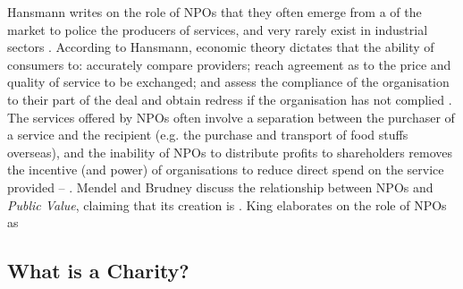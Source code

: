 %
Hansmann writes on the role of NPOs that they often emerge from a  of the market to police the producers of services, and very rarely exist in industrial sectors \cite{hansmann_role_1980}. According to Hansmann, economic theory dictates that the ability of consumers to: accurately compare providers; reach agreement as to the price and quality of service to be exchanged; and assess the compliance of the organisation to their part of the deal and obtain redress if the organisation has not complied \cite{hansmann_role_1980}. The services offered by NPOs often involve a separation between the purchaser of a service and the recipient (e.g. the purchase and transport of food stuffs overseas), and the inability of NPOs to distribute profits to shareholders removes the incentive (and power) of organisations to reduce direct spend on the service provided --  \cite{hansmann_role_1980}.
%
Mendel and Brudney discuss the relationship between NPOs and \textit{Public Value}, claiming that its creation is  \cite{mendel_doing_2014}. King elaborates on the role of NPOs as


\subsection{What is a Charity?}
%
